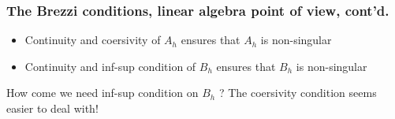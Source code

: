 \begin{frame}
 \frametitle{The Brezzi conditions, linear algebra point of view, cont'd. }
 \begin{itemize}
 \item Continuity and coersivity of $A_h$ ensures that $A_h$ is non-singular 
 \item Continuity and inf-sup condition of $B_h$ ensures that $B_h$ is non-singular 
 \end{itemize}
How come we need inf-sup condition on $B_h$ ? The coersivity condition seems easier to deal with!  
\end{frame}


